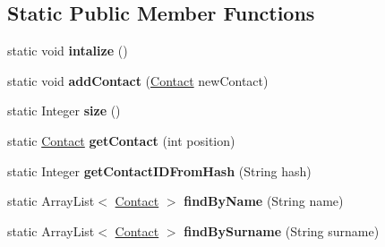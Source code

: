 \subsection*{Static Public Member Functions}
\begin{DoxyCompactItemize}
\item 
\mbox{\label{classcloud_1_1ptl_1_1persistence_1_1ContactManager_ab7b470e606d49db74c139adbcceeb782}} 
static void {\bfseries intalize} ()
\item 
\mbox{\label{classcloud_1_1ptl_1_1persistence_1_1ContactManager_a09926dcf77240781f05e4157ef365658}} 
static void {\bfseries add\+Contact} (\hyperlink{classcloud_1_1ptl_1_1persistence_1_1Contact}{Contact} new\+Contact)
\item 
\mbox{\label{classcloud_1_1ptl_1_1persistence_1_1ContactManager_ade1723d6dbbaa5eff75aa83fa761d2ac}} 
static Integer {\bfseries size} ()
\item 
\mbox{\label{classcloud_1_1ptl_1_1persistence_1_1ContactManager_a5817e662f7568040b24dea9151ff2340}} 
static \hyperlink{classcloud_1_1ptl_1_1persistence_1_1Contact}{Contact} {\bfseries get\+Contact} (int position)
\item 
\mbox{\label{classcloud_1_1ptl_1_1persistence_1_1ContactManager_af214473ac147cefe2435594e81471b81}} 
static Integer {\bfseries get\+Contact\+I\+D\+From\+Hash} (String hash)
\item 
\mbox{\label{classcloud_1_1ptl_1_1persistence_1_1ContactManager_a78f6913405f16e3f132307d92a0c4dc7}} 
static Array\+List$<$ \hyperlink{classcloud_1_1ptl_1_1persistence_1_1Contact}{Contact} $>$ {\bfseries find\+By\+Name} (String name)
\item 
\mbox{\label{classcloud_1_1ptl_1_1persistence_1_1ContactManager_afee00f141daa7e27dd3c81dc759ab147}} 
static Array\+List$<$ \hyperlink{classcloud_1_1ptl_1_1persistence_1_1Contact}{Contact} $>$ {\bfseries find\+By\+Surname} (String surname)
\end{DoxyCompactItemize}
